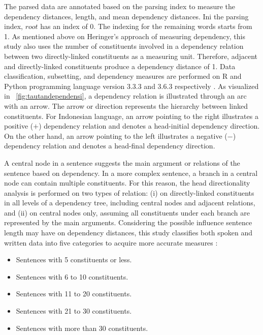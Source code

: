 \documentclass[10pt, a4paper, conference, compsocconf]{IEEEtran}
\begin{document}
The parsed data are annotated based on the parsing index to measure the dependency distances, length, and mean dependency distances. Ini the parsing index, $root$ has an index of 0. The indexing for the remaining words starts from 1. As mentioned above on Heringer's approach of measuring dependency, this study also uses the number of constituents involved in a dependency relation between two directly-linked constituents as a measuring unit. Therefore, adjacent and directly-linked constituents produce a dependency distance of 1. Data classification, subsetting, and dependency measures are performed on R and Python programming language version 3.3.3 and 3.6.3 respectively \cite{r2017project, python2017manual}. As visualized in \pic~\ref{fig:tautandependensi}, a dependency relation is illustrated through an arc with an arrow. The arrow or direction represents the hierarchy between linked constituents. For Indonesian language, an arrow pointing to the right illustrates a positive ($+$) dependency relation and denotes a head-initial dependency direction. On the other hand, an arrow pointing to the left illustrates a negative ($-$) dependency relation and denotes a head-final dependency direction.

A central node in a sentence suggests the main argument or relations of the sentence based on dependency. In a more complex sentence, a branch in a central node can contain multiple constituents. For this reason, the head directionality analysis is performed on two types of relation: (i) on directly-linked constituents in all levels of a dependency tree, including central nodes and adjacent relations, and (ii) on central nodes only, assuming all constituents under each branch are represented by the main arguments. Considering the possible influence sentence length may have on dependency distances, this study classifies both spoken and written data into five categories to acquire more accurate measures \cite{liu2017dependency, i2004euclidean, oya2011syntactic, jiang2015effects}:
\begin{itemize}
\item Sentences with 5 constituents or less.
\item Sentences with 6 to 10 constituents.
\item Sentences with 11 to 20 constituents.
\item Sentences with 21 to 30 constituents.
\item Sentences with more than 30 constituents.
\end{itemize}
\end{document}
